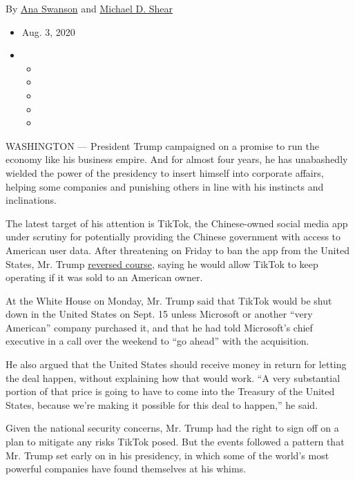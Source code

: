 By \href{https://www.nytimes3xbfgragh.onion/by/ana-swanson}{Ana Swanson}
and \href{https://www.nytimes3xbfgragh.onion/by/michael-d-shear}{Michael
D. Shear}

\begin{itemize}
\item
  Aug. 3, 2020
\item
  \begin{itemize}
  \item
  \item
  \item
  \item
  \item
  \end{itemize}
\end{itemize}

WASHINGTON --- President Trump campaigned on a promise to run the
economy like his business empire. And for almost four years, he has
unabashedly wielded the power of the presidency to insert himself into
corporate affairs, helping some companies and punishing others in line
with his instincts and inclinations.

The latest target of his attention is TikTok, the Chinese-owned social
media app under scrutiny for potentially providing the Chinese
government with access to American user data. After threatening on
Friday to ban the app from the United States, Mr. Trump
\href{https://www.nytimes3xbfgragh.onion/2020/08/03/technology/trump-tiktok-microsoft.html}{reversed
course}, saying he would allow TikTok to keep operating if it was sold
to an American owner.

At the White House on Monday, Mr. Trump said that TikTok would be shut
down in the United States on Sept. 15 unless Microsoft or another ``very
American'' company purchased it, and that he had told Microsoft's chief
executive in a call over the weekend to ``go ahead'' with the
acquisition.

He also argued that the United States should receive money in return for
letting the deal happen, without explaining how that would work. ``A
very substantial portion of that price is going to have to come into the
Treasury of the United States, because we're making it possible for this
deal to happen,'' he said.

Given the national security concerns, Mr. Trump had the right to sign
off on a plan to mitigate any risks TikTok posed. But the events
followed a pattern that Mr. Trump set early on in his presidency, in
which some of the world's most powerful companies have found themselves
at his whims.


